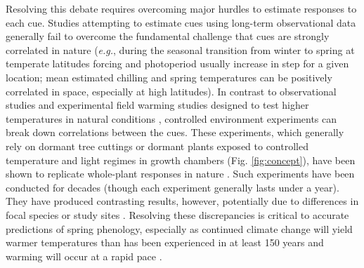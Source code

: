 \documentclass{article}
\begin{document}
\par Resolving this debate requires overcoming major hurdles to estimate responses to each cue. Studies attempting to estimate cues using long-term observational data \emph{\citep[e.g.,][]{zohner2016,vitasse2013}} generally fail to overcome the fundamental challenge that cues are strongly correlated in nature (\emph{e.g.}, during the seasonal transition from winter to spring at temperate latitudes forcing and photoperiod usually increase in step for a given location; mean estimated chilling and spring temperatures can be positively correlated in space, especially at high latitudes). In contrast to observational studies and experimental field warming studies designed to test higher temperatures in natural conditions \emph{\citep{Wolkovich:2012n}}, controlled environment experiments can break down correlations between the cues. These experiments, which generally rely on dormant tree cuttings or dormant plants exposed to controlled temperature and light regimes in growth chambers (Fig. \ref{fig:concept}), have been shown to replicate whole-plant responses in nature \citep{vitasse2014}. Such experiments have been conducted for decades (though each experiment generally lasts under a year). They have produced contrasting results, however, potentially due to differences in focal species or study sites \emph{\citep{zohner2016,Caffarra:2011b,Laube:2014a,Basler:2012,Caffarra:2011a}}. Resolving these discrepancies is critical to accurate predictions of spring phenology, especially as continued climate change will yield warmer temperatures than has been experienced in at least 150 years and warming will occur at a rapid pace \emph{\citep{ohlemuller2006,williams2007,williams2007b,ipcc2013,xu2018}}.

\end{document}
